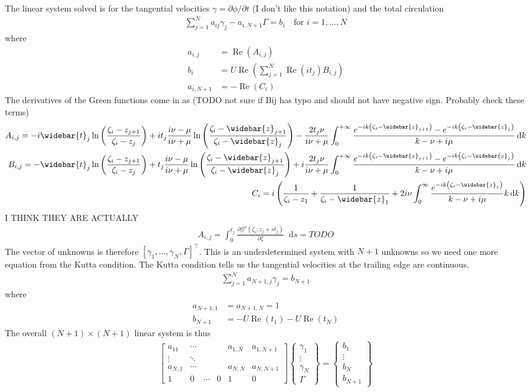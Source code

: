 \documentclass[10pt]{article}
\newcommand{\diff}{\mathop{}\!\tn{d}} %
\newcommand{\pp}[2]{\frac{\partial #1}{\partial #2}}
\newcommand{\mcal}[1]{\mathcal{#1}} %
\newcommand{\beq}{\begin{equation}\begin{aligned}}
\newcommand{\eeq}{\end{aligned}\end{equation}}
\newcommand{\tn}[1]{\textrm{#1}}
\renewcommand{\Re}{\operatorname{Re}}
\begin{document}
The linear system solved is for the tangential velocities $\gamma=\partial\phi/\partial t$ (I don't like this notation) and the total circulation
\beq
\sum_{j=1}^{N}{a_{ij} \gamma_j}
- a_{i,N+1} \Gamma  =
b_i
\quad \tn{for }
i=1,...,N
\eeq
where
\beq
a_{i,j} & = \Re\left(A_{i,j}\right)
\\
b_i & = U \Re \left( \sum_{j=1}^{N} \Re\left(i t_j\right)B_{i,j}\right)
\\
a_{i,N+1} & = -\Re\left(C_i\right)
\eeq
The derivatives of the Green functions come in as (TODO not sure if Bij has typo and should not have negative sign. Probably check these terms)
\beq
A_{i,j} = -i \widebar{t}_j \ln \left(\frac{\zeta_i - z_{j+1}}{\zeta_i - z_j}\right)
+ i t_j \frac{i\nu - \mu}{i\nu + \mu}\ln \left(\frac{\zeta_i-\widebar{z}_{j+1}}{\zeta_i - \widebar{z}_j}\right)
- \frac{2t_j \nu}{i\nu + \mu} \int_{0}^{+ \infty} \frac{e^{-i k \left(\zeta_i - \widebar{z}_{j+1} \right)} - e^{-ik\left(\zeta_i - \widebar{z}_j\right)} }{k-\nu + i \mu} \diff k
\\
B_{i,j} = -\widebar{t}_j \ln \left(\frac{\zeta_i - z_{j+1}}{\zeta_i - z_j}\right)
+  t_j \frac{i\nu - \mu}{i\nu + \mu}\ln \left(\frac{\zeta_i-\widebar{z}_{j+1}}{\zeta_i - \widebar{z}_j}\right)
+ i \frac{2t_j \nu}{i\nu + \mu} \int_{0}^{+ \infty} \frac{e^{-i k \left(\zeta_i - \widebar{z}_{j+1} \right)} - e^{-ik\left(\zeta_i - \widebar{z}_j\right)} }{k-\nu + i \mu} \diff k
\\
C_i = i \left(
\frac{1}{\zeta_i - z_1} + \frac{1}{\zeta_i - \widebar{z}_1} + 2i\nu \int_{0}^{\infty}
\frac{e^{-ik \left(\zeta_i - \widebar{z}_1\right)}}{k- \nu + i\mu} k \diff k
\right)
\eeq
I THINK THEY ARE ACTUALLY
\beq
A_{i,j}=\int_0^{\ell_j} \pp{\mcal{G}^v(\zeta_i; z_j + s t_j)}{\zeta} \diff s
=
TODO
\eeq
The vector of unknowns is therefore $[\gamma_1,...,\gamma_N, \Gamma]^\top$.
This is an underdetermined system with $N+1$ unknowns so we need one more equation from the Kutta condition.
The Kutta condition tells us the tangential velocities at the trailing edge are continuous.
\beq
\sum_{j=1}^{N} a_{N+1,j} \gamma_j= b_{N+1}
\eeq
where
\beq
a_{N+1,1} & = a_{N+1,N} = 1
\\
b_{N+1} & = -U \Re(t_1) - U \Re(t_N)
\eeq
The overall $(N+1)\times (N+1)$ linear system is thus
\beq
\begin{bmatrix}
	a_{11}  & \cdots &        &   & a_{1,N} & a_{1,N+1} \\
	\vdots  & \ddots                                    \\
	a_{N,1} & \cdots &        &   & a_{N,N} & a_{N,N+1} \\
	1       & 0      & \cdots & 0 & 1       & 0
\end{bmatrix}
\left\{
\begin{matrix}
	\gamma_1 \\
	\vdots   \\
	\gamma_N \\
	\Gamma
\end{matrix}
\right\}
=
\left\{
\begin{matrix}
	b_1    \\
	\vdots \\
	b_N    \\
	b_{N+1}
\end{matrix}
\right\}
\eeq
\end{document}

